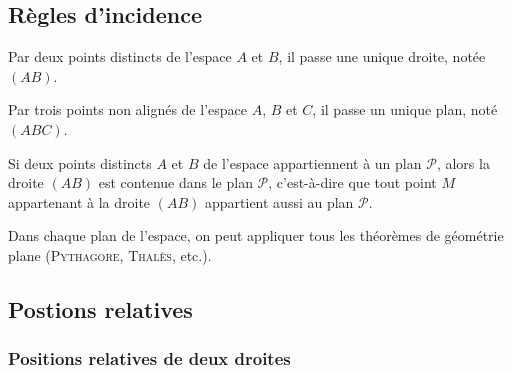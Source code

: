\subsection{Règles d'incidence}

\begin{regle}
Par deux points distincts de l'espace $A$ et $B$, il passe une unique droite, notée $(AB)$.
\end{regle}

\begin{regle}
Par trois points non alignés de l'espace $A$, $B$ et $C$, il passe un unique plan, noté $(ABC)$.
\end{regle}

\begin{regle}
Si deux points distincts $A$ et $B$ de l'espace appartiennent à un plan $\mathcal{P}$, alors la droite $(AB)$ est contenue dans le plan $\mathcal{P}$, c'est-à-dire que tout point $M$ appartenant à la droite $(AB)$ appartient aussi au plan $\mathcal{P}$.
\end{regle}

\begin{regle}
Dans chaque plan de l'espace, on peut appliquer tous les théorèmes de géométrie plane (\textsc{Pythagore}, \textsc{Thalès}, etc.).
\end{regle}

\subsection{Postions relatives}
\subsubsection{Positions relatives de deux droites}


